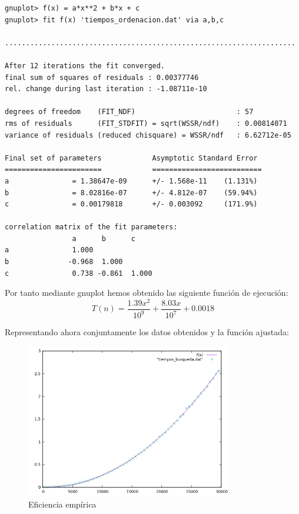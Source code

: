 \documentclass{article}
\begin{document}
\begin{lstlisting}
gnuplot> f(x) = a*x**2 + b*x + c
gnuplot> fit f(x) 'tiempos_ordenacion.dat' via a,b,c

.....................................................................          

After 12 iterations the fit converged.
final sum of squares of residuals : 0.00377746
rel. change during last iteration : -1.08711e-10

degrees of freedom    (FIT_NDF)                        : 57
rms of residuals      (FIT_STDFIT) = sqrt(WSSR/ndf)    : 0.00814071
variance of residuals (reduced chisquare) = WSSR/ndf   : 6.62712e-05

Final set of parameters            Asymptotic Standard Error
=======================            ==========================
a               = 1.38647e-09      +/- 1.568e-11    (1.131%)
b               = 8.02816e-07      +/- 4.812e-07    (59.94%)
c               = 0.00179818       +/- 0.003092     (171.9%)

correlation matrix of the fit parameters:
                a      b      c      
a               1.000 
b              -0.968  1.000 
c               0.738 -0.861  1.000 
\end{lstlisting}
\vspace{10mm}
	Por tanto mediante gnuplot hemos obtenido las siguiente función de ejecución:
	\begin{equation}
		T(n) = \frac{1.39x^2}{10^9} + \frac{8.03x}{10^7} + 0.0018
        \end{equation}

        Representando ahora conjuntamente los datos obtenidos y la función ajustada:
        
\begin{figure}[H]
\caption{Eficiencia empírica}
\centering
\includegraphics[width=0.8\textwidth]{ejer2/grafica.png}
\end{figure}
            
\end{document}
